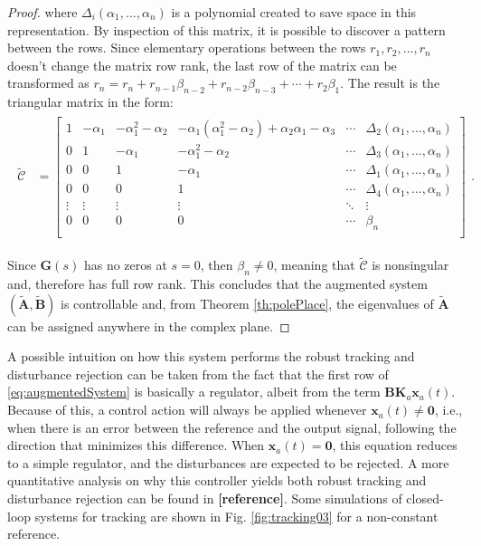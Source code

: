 \documentclass[a4paper,11pt]{book}
\numberwithin{figure}{chapter}
\numberwithin{equation}{chapter}
\numberwithin{table}{chapter}
\theoremstyle{definition}
\begin{document}
\begin{proof}
    \noindent where $\Delta_i(\alpha_1,...,\alpha_n)$ is a polynomial created to save space in this representation. By inspection of this matrix, it is possible to discover a pattern between the rows. Since elementary operations between the rows ${r_1, r_2, ..., r_n}$ doesn't change the matrix row rank, the last row of the matrix can be transformed as $r_n = r_n + r_{n-1}\beta_{n-2} + r_{n-2}\beta_{n-3} + \cdots + r_{2}\beta_{1}$. The result is the triangular matrix in the form:
    \begin{align}
    \begin{split}
        \tilde{\bm{\mathcal{C}}} &= 
            \begin{bmatrix}
                1 & -\alpha_1 & -\alpha_1^2 - \alpha_2 & -\alpha_1(\alpha_1^2 - \alpha_2) + \alpha_2 \alpha_1 - \alpha_3 & \cdots & \Delta_2(\alpha_1,...,\alpha_n) \\
                0 & 1 & -\alpha_1 & -\alpha_1^2 - \alpha_2  & \cdots & \Delta_3(\alpha_1,...,\alpha_n) \\
                0 & 0 & 1 & -\alpha_1  & \cdots & \Delta_1(\alpha_1,...,\alpha_n) \\
                0 & 0 & 0 & 1 &  \cdots & \Delta_4(\alpha_1,...,\alpha_n) \\
                \vdots & \vdots & \vdots & \vdots & \ddots & \vdots \\
                0 & 0 & 0 & 0  & \cdots & \beta_n \\
            \end{bmatrix}
    \end{split}
    .\end{align}
    
    Since $\bm{G}(s)$ has no zeros at $s = 0$, then $\beta_n \neq 0$, meaning that $\tilde{\bm{\mathcal{C}}}$ is nonsingular and, therefore has full row rank. This concludes that the augmented system $(\tilde{\bm{A}}, \tilde{\bm{B}})$ is controllable and, from Theorem \ref{th:polePlace}, the eigenvalues of $\tilde{\bm{A}}$ can be assigned anywhere in the complex plane.
\end{proof}

A possible intuition on how this system performs the robust tracking and disturbance rejection can be taken from the fact that the first row of \eqref{eq:augmentedSystem} is basically a regulator, albeit from the term $\bm{B} \bm{K}_a \bm{x}_a(t)$. Because of this, a control action will always be applied whenever $\bm{x}_a(t) \neq \bm{0}$, i.e., when there is an error between the reference and the output signal, following the direction that minimizes this difference. When $\bm{x}_a(t) = \bm{0}$, this equation reduces to a simple regulator, and the disturbances are expected to be rejected. A more quantitative analysis on why this controller yields both robust tracking and disturbance rejection can be found in \textbf{[reference]}. Some simulations of closed-loop systems for tracking are shown in Fig. \ref{fig:tracking03} for a non-constant reference.
\end{document}
